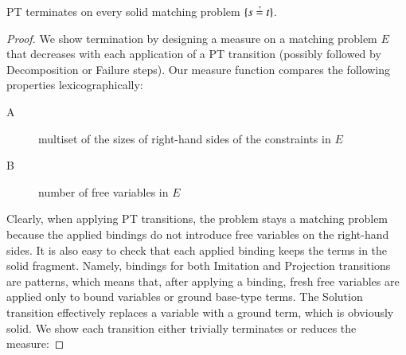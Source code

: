 \begin{lemma}
    \label{unif:lemma:pt-matching-termination}
    PT terminates on every solid matching problem $\{s \unif t\}$.
\end{lemma}
\begin{proof}
    We show termination by designing a measure on a matching problem $E$ that
    decreases with each application of a PT transition (possibly followed by
    \textsf{Decomposition} or \textsf{Failure} steps). 
    Our measure function
    compares the following properties lexicographically:
    \begin{description}
        \item[A] multiset of the sizes of right-hand sides of the constraints in $E$
        \item[B] number of free variables in $E$
    \end{description}

    Clearly, when applying PT transitions, the problem stays a matching problem
    because the applied bindings do not introduce free variables on the
    right-hand sides. It is also easy to check that each applied binding keeps
    the terms in the solid fragment. Namely, bindings for both
    \textsf{Imitation} and \textsf{Projection} transitions are patterns, which means
    that, after applying a binding, fresh free variables are applied only to
    bound variables or ground base-type terms. The \textsf{Solution} transition effectively
    replaces a variable with a ground term, which is obviously solid. We show each transition 
    either trivially terminates or reduces the measure:


\end{proof}
